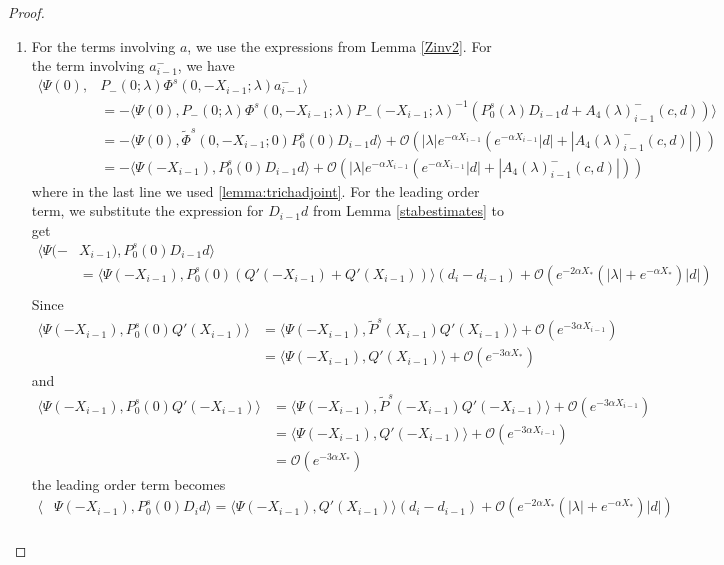 \documentclass[thesis.tex]{subfiles}
\begin{document}
\begin{lemma}
\begin{proof}
\begin{enumerate}
\item For the terms involving $a$, we use the expressions from Lemma \ref{Zinv2}. For the term involving $a_{i-1}^-$, we have
\begin{align*}
\langle \Psi(0), &P_-(0; \lambda) \Phi^s(0, -X_{i-1}; \lambda) a_{i-1}^- \rangle \\
&= -\langle \Psi(0), P_-(0; \lambda) \Phi^s(0, -X_{i-1}; \lambda) P_-(-X_{i-1}; \lambda)^{-1} \left( P_0^s(\lambda) D_{i-1} d + A_4(\lambda)_{i-1}^-(c, d) \right) \rangle \\
&= -\langle \Psi(0), \tilde{\Phi}^s(0, -X_{i-1}; 0)P_0^s(0) D_{i-1} d \rangle 
+\mathcal{O}\left( |\lambda|e^{-\alpha X_{i-1}}(e^{-\alpha X_{i-1}}|d| + |A_4(\lambda)_{i-1}^-(c, d)|) \right) \\
&= -\langle \Psi(-X_{i-1}), P_0^s(0) D_{i-1} d \rangle +\mathcal{O}\left( |\lambda|e^{-\alpha X_{i-1}}(e^{-\alpha X_{i-1}}|d| + |A_4(\lambda)_{i-1}^-(c, d)|) \right)
\end{align*}
where in the last line we used \cref{lemma:trichadjoint}. For the leading order term, we substitute the expression for $D_{i-1}d$ from Lemma \ref{stabestimates} to get 
\begin{align*}
\langle \Psi(-&X_{i-1}), P_0^s(0) D_{i-1} d \rangle \\
&= \langle \Psi(-X_{i-1}), P_0^s(0)( Q'(-X_{i-1}) + Q'(X_{i-1})) \rangle (d_i - d_{i-1} ) + \mathcal{O}(e^{-2 \alpha X_*}(|\lambda| + e^{-\alpha X_*})|d|) \\
\end{align*}
Since
\begin{align*}
\langle \Psi(-X_{i-1}), P_0^s(0) Q'(X_{i-1})\rangle
&= \langle \Psi(-X_{i-1}), \tilde{P}^s(X_{i-1}) Q'(X_{i-1})\rangle + \mathcal{O}(e^{-3 \alpha X_{i-1}}) \\
&= \langle \Psi(-X_{i-1}), Q'(X_{i-1})\rangle + \mathcal{O}(e^{-3\alpha X_*})
\end{align*}
and
\begin{align*}
\langle \Psi(-X_{i-1}), P_0^s(0) Q'(-X_{i-1})\rangle
&= \langle \Psi(-X_{i-1}), \tilde{P}^s(-X_{i-1}) Q'(-X_{i-1})\rangle + \mathcal{O}(e^{-3 \alpha X_{i-1}}) \\
&= \langle \Psi(-X_{i-1}), Q'(-X_{i-1})\rangle + \mathcal{O}(e^{-3 \alpha X_{i-1}}) \\
&= \mathcal{O}(e^{-3 \alpha X_*})
\end{align*}
the leading order term becomes
\begin{align*}
\langle &\Psi(-X_{i-1}), P_0^s(0) D_i d \rangle = \langle \Psi(-X_{i-1}), Q'(X_{i-1}) \rangle (d_i - d_{i-1} ) + \mathcal{O}(e^{-2 \alpha X_*}(|\lambda| + e^{-\alpha X_*})|d|) \\

\end{align*}
\end{enumerate}
\end{proof}
\end{lemma}
\end{document}

